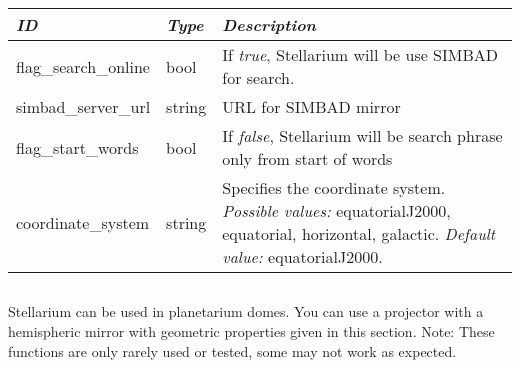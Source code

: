 \begin{tabularx}{\textwidth}{l|l|X}\toprule
\emph{ID} & \emph{Type} & \emph{Description}\\\midrule
flag\_search\_online & bool   & If \emph{true}, Stellarium will be use SIMBAD for search.\\%
simbad\_server\_url  & string & URL for SIMBAD mirror\\%
flag\_start\_words   & bool   & If \emph{false}, Stellarium will be search phrase only from start of words\\%
coordinate\_system   & string & Specifies the coordinate system. 
                                \emph{Possible values:} equatorialJ2000, equatorial, horizontal, galactic. \emph{Default value:} equatorialJ2000.\\
\bottomrule
\end{tabularx}

\subsection{}

Stellarium can be used in planetarium domes. You can use a projector with a hemispheric mirror with geometric properties given in this section. 
Note: These functions are only rarely used or tested, some may not work as expected.
 
